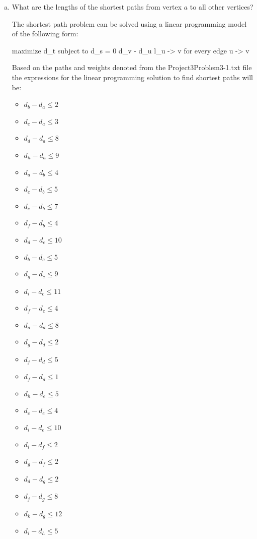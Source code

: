 \documentclass[../report/main.tex]{subfiles}
\begin{document}
\begin{enumerate}[a)]
	\item What are the lengths of the shortest paths from vertex $a$ to all other vertices?

    The shortest path problem can be solved using a linear programming model of the following form:

    maximize d_t
    subject to d_s = 0
               d_v - d_u \leq l_{u -> v} for every edge u -> v

    Based on the paths and weights denoted from the Project3Problem3-1.txt file the expressions for the linear programming solution to find shortest paths will be:

    \begin{itemize}
      \item $d_b - d_a \leq 2$
      \item $d_c - d_a \leq 3$
      \item $d_d - d_a \leq 8$
      \item $d_h - d_a \leq 9$
      \item $d_a - d_b \leq 4$
      \item $d_c - d_b \leq 5$
      \item $d_e - d_b \leq 7$
      \item $d_f - d_b \leq 4$
      \item $d_d - d_c \leq 10$
      \item $d_b - d_c \leq 5$
      \item $d_g - d_c \leq 9$
      \item $d_i - d_c \leq 11$
      \item $d_f - d_c \leq 4$
      \item $d_a - d_d \leq 8$
      \item $d_g - d_d \leq 2$
      \item $d_j - d_d \leq 5$
      \item $d_f - d_d \leq 1$
      \item $d_h - d_e \leq 5$
      \item $d_c - d_e \leq 4$
      \item $d_i - d_e \leq 10$
      \item $d_i - d_f \leq 2$
      \item $d_g - d_f \leq 2$
      \item $d_d - d_g \leq 2$
      \item $d_j - d_g \leq 8$
      \item $d_k - d_g \leq 12$
      \item $d_i - d_h \leq 5$

\end{itemize}
\end{enumerate}
\end{document}
